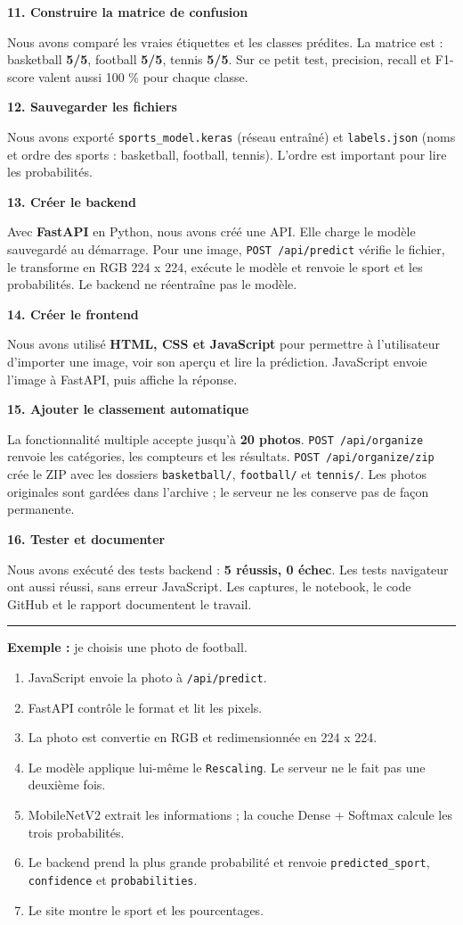 \documentclass[10pt,a4paper]{article}
\newcommand{\partie}[1]{\vspace{6pt}{\large\bfseries\color{vert}#1}\par\vspace{2pt}\hrule\vspace{4pt}}
\newcommand{\etape}[3]{\textbf{#1. #2}\par #3\par\vspace{3pt}}
\begin{document}
\etape{11}{Construire la matrice de confusion}{Nous avons comparé les vraies étiquettes et les classes prédites. La matrice est : basketball \textbf{5/5}, football \textbf{5/5}, tennis \textbf{5/5}. Sur ce petit test, precision, recall et F1-score valent aussi 100 \% pour chaque classe.}
\etape{12}{Sauvegarder les fichiers}{Nous avons exporté \texttt{sports\_model.keras} (réseau entraîné) et \texttt{labels.json} (noms et ordre des sports : basketball, football, tennis). L'ordre est important pour lire les probabilités.}
\etape{13}{Créer le backend}{Avec \textbf{FastAPI} en Python, nous avons créé une API. Elle charge le modèle sauvegardé au démarrage. Pour une image, \texttt{POST /api/predict} vérifie le fichier, le transforme en RGB 224 x 224, exécute le modèle et renvoie le sport et les probabilités. Le backend ne réentraîne pas le modèle.}
\etape{14}{Créer le frontend}{Nous avons utilisé \textbf{HTML, CSS et JavaScript} pour permettre à l'utilisateur d'importer une image, voir son aperçu et lire la prédiction. JavaScript envoie l'image à FastAPI, puis affiche la réponse.}
\etape{15}{Ajouter le classement automatique}{La fonctionnalité multiple accepte jusqu'à \textbf{20 photos}. \texttt{POST /api/organize} renvoie les catégories, les compteurs et les résultats. \texttt{POST /api/organize/zip} crée le ZIP avec les dossiers \texttt{basketball/}, \texttt{football/} et \texttt{tennis/}. Les photos originales sont gardées dans l'archive ; le serveur ne les conserve pas de façon permanente.}
\etape{16}{Tester et documenter}{Nous avons exécuté des tests backend : \textbf{5 réussis, 0 échec}. Les tests navigateur ont aussi réussi, sans erreur JavaScript. Les captures, le notebook, le code GitHub et le rapport documentent le travail.}

\partie{3. Comment une prédiction fonctionne ?}
\textbf{Exemple :} je choisis une photo de football.
\begin{enumerate}[leftmargin=*,itemsep=0pt]
\item JavaScript envoie la photo à \texttt{/api/predict}.
\item FastAPI contrôle le format et lit les pixels.
\item La photo est convertie en RGB et redimensionnée en 224 x 224.
\item Le modèle applique lui-même le \texttt{Rescaling}. Le serveur ne le fait pas une deuxième fois.
\item MobileNetV2 extrait les informations ; la couche Dense + Softmax calcule les trois probabilités.
\item Le backend prend la plus grande probabilité et renvoie \texttt{predicted\_sport}, \texttt{confidence} et \texttt{probabilities}.
\item Le site montre le sport et les pourcentages.
\end{enumerate}
\end{document}

